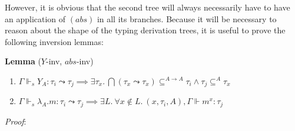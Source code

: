 \documentclass[a4paper, 12pt, twoside]{style/ociamthesis}
\theoremstyle{plain}
\theoremstyle{definition}
\theoremstyle{remark}
\providecommand{\tightlist}{%
  \setlength{\itemsep}{0pt}\setlength{\parskip}{0pt}}
\newcommand{\concat}{\ensuremath{+\!\!\!\!+\,}}
\newcommand{\tocap}{\leadsto\kern-.5ex\cap}
\begin{document}

However, it is obvious that the second tree will always necessarily have
to have an application of \((abs)\) in all its branches. Because it will
be necessary to reason about the shape of the typing derivation trees,
it is useful to prove the following inversion lemmas:

\textbf{Lemma} (\(Y\)-inv, \(abs\)-inv)

\begin{enumerate}
\def\labelenumi{\roman{enumi})}
\tightlist
\item
  \(\Gamma \Vdash_s Y_{A} : \tau_i \leadsto \tau_j \implies \exists \tau_x.\ \bigcap (\tau_x \leadsto \tau_x) \subseteq^{A \to A} \tau_i \land \tau_j \subseteq^A \tau_x\)
\item
  \(\Gamma \Vdash_s \lambda_A.m : \tau_i \leadsto \tau_j \implies \exists L.\ \forall x \not\in L.\ (x, \tau_i, A),\Gamma \Vdash m^x : \tau_j\)
\end{enumerate}

\emph{Proof}:
\end{document}

